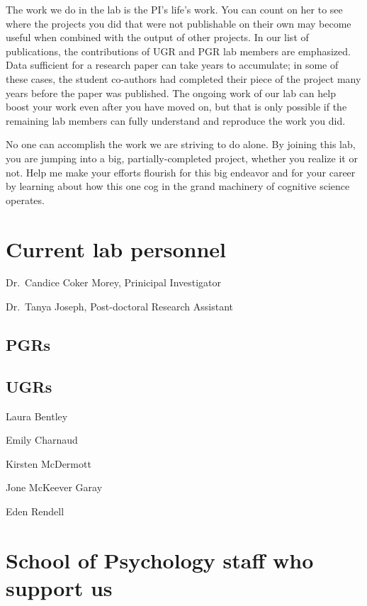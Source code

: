 \documentclass[12pt,]{book}
\theoremstyle{definition}
\theoremstyle{definition}
\theoremstyle{definition}
\theoremstyle{remark}
\begin{document}
The work we do in the lab is the PI's life's work. You can count on her
to see where the projects you did that were not publishable on their own
may become useful when combined with the output of other projects. In
our list of publications, the contributions of UGR and PGR lab members
are emphasized. Data sufficient for a research paper can take years to
accumulate; in some of these cases, the student co-authors had completed
their piece of the project many years before the paper was published.
The ongoing work of our lab can help boost your work even after you have
moved on, but that is only possible if the remaining lab members can
fully understand and reproduce the work you did.

No one can accomplish the work we are striving to do alone. By joining
this lab, you are jumping into a big, partially-completed project,
whether you realize it or not. Help me make your efforts flourish for
this big endeavor and for your career by learning about how this one cog
in the grand machinery of cognitive science operates.

\section{Current lab personnel}\label{current-lab-personnel}

Dr.~Candice Coker Morey, Prinicipal Investigator

Dr.~Tanya Joseph, Post-doctoral Research Assistant

\subsection{PGRs}\label{pgrs}

\subsection{UGRs}\label{ugrs}

Laura Bentley

Emily Charnaud

Kirsten McDermott

Jone McKeever Garay

Eden Rendell

\section{School of Psychology staff who support
us}\label{school-of-psychology-staff-who-support-us}
\end{document}
